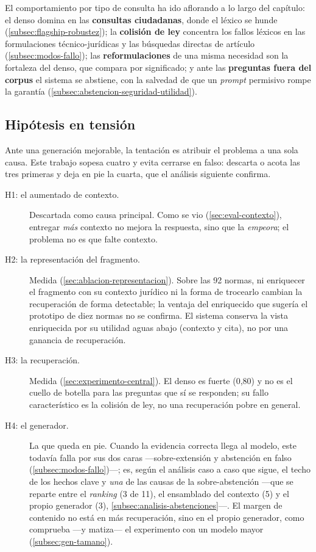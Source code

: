 El comportamiento por tipo de consulta ha ido aflorando a lo largo del capítulo: el denso domina en las \textbf{consultas ciudadanas}, donde el léxico se hunde (\ref{subsec:flagship-robustez}); la \textbf{colisión de ley} concentra los fallos léxicos en las formulaciones técnico-jurídicas y las búsquedas directas de artículo (\ref{subsec:modos-fallo}); las \textbf{reformulaciones} de una misma necesidad son la fortaleza del denso, que compara por significado; y ante las \textbf{preguntas fuera del corpus} el sistema se abstiene, con la salvedad de que un \emph{prompt} permisivo rompe la garantía (\ref{subsec:abstencion-seguridad-utilidad}).

\subsection{Hipótesis en tensión}
\label{subsec:hipotesis}

Ante una generación mejorable, la tentación es atribuir el problema a una sola causa. Este trabajo sopesa cuatro y evita cerrarse en falso: descarta o acota las tres primeras y deja en pie la cuarta, que el análisis siguiente confirma.

\begin{description}
  \item[H1: el aumentado de contexto.] Descartada como causa principal. Como se vio (\ref{sec:eval-contexto}), entregar \emph{más} contexto no mejora la respuesta, sino que la \emph{empeora}; el problema no es que falte contexto.
  \item[H2: la representación del fragmento.] Medida (\ref{sec:ablacion-representacion}). Sobre las 92 normas, ni enriquecer el fragmento con su contexto jurídico ni la forma de trocearlo cambian la recuperación de forma detectable; la ventaja del enriquecido que sugería el prototipo de diez normas no se confirma. El sistema conserva la vista enriquecida por su utilidad aguas abajo (contexto y cita), no por una ganancia de recuperación.
  \item[H3: la recuperación.] Medida (\ref{sec:experimento-central}). El denso es fuerte (0,80) y no es el cuello de botella para las preguntas que sí se responden; su fallo característico es la colisión de ley, no una recuperación pobre en general.
  \item[H4: el generador.] La que queda en pie. Cuando la evidencia correcta llega al modelo, este todavía falla por sus dos caras —sobre-extensión y abstención en falso (\ref{subsec:modos-fallo})—; es, según el análisis caso a caso que sigue, el techo de los hechos clave y \emph{una} de las causas de la sobre-abstención —que se reparte entre el \emph{ranking} (3 de 11), el ensamblado del contexto (5) y el propio generador (3), \ref{subsec:analisis-abstenciones}—. El margen de contenido no está en más recuperación, sino en el propio generador, como comprueba —y matiza— el experimento con un modelo mayor (\ref{subsec:gen-tamano}).
\end{description}

